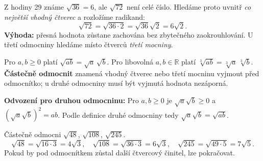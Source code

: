 \documentclass[11pt,a4paper]{article}
\begin{document}

Z hodiny 29 známe $\sqrt{36}=6$, ale $\sqrt{72}$ není celé číslo.
Hledáme proto uvnitř \emph{co největší vhodný čtverec} a rozložíme radikand:
\[
\sqrt{72}=\sqrt{36\cdot2}=\sqrt{36}\sqrt2=\boxed{6\sqrt2}.
\]
\textbf{Výhoda:} přesná hodnota zůstane zachována bez zbytečného zaokrouhlování.
U třetí odmocniny hledáme místo čtverců \emph{třetí mocniny}.

\begin{zadaniBox}[title={Věta - Odmocnina ze součinu}]
Pro $a,b\ge0$ platí $\sqrt{ab}=\sqrt a\,\sqrt b$.
Pro libovolná $a,b\in\mathbb R$ platí
$\sqrt[3]{ab}=\sqrt[3]a\,\sqrt[3]b$.
\textbf{Částečně odmocnit} znamená vhodný čtverec nebo třetí mocninu
vyjmout před odmocnítko; u druhé odmocniny musí být vyjmutá hodnota nezáporná.
\end{zadaniBox}
\textbf{Odvození pro druhou odmocninu:}
Pro $a,b\ge0$ je $\sqrt a\sqrt b\ge0$ a
$(\sqrt a\sqrt b)^2=ab$. Podle definice druhé odmocniny tedy
$\sqrt a\sqrt b=\sqrt{ab}$.

\begin{prikladReseniBox}[breakable=false,title={Příklad 1}]
Částečně odmocni $\sqrt{48}$, $\sqrt{108}$, $\sqrt{245}$.
\tcblower
\[
\sqrt{48}=\sqrt{16\cdot3}=4\sqrt3,\quad
\sqrt{108}=\sqrt{36\cdot3}=6\sqrt3,\quad
\sqrt{245}=\sqrt{49\cdot5}=7\sqrt5.
\]
Pokud by pod odmocnítkem zůstal další čtvercový činitel, lze pokračovat.
\end{prikladReseniBox}
\end{document}
